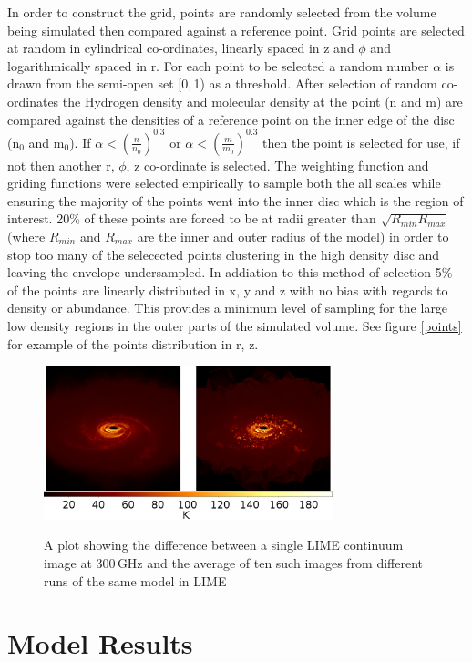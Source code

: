 \documentclass[useAMS,usenatbib]{mn2e}
\begin{document}
In order to construct the grid, points are randomly selected from the volume being simulated then compared against a reference point. Grid points are selected at random in cylindrical co-ordinates, linearly spaced in z and $\phi$ and logarithmically spaced in r. For each point to be selected a random number $\alpha$ is drawn from the semi-open set [0,$\,$1) as a threshold. After selection of random co-ordinates the Hydrogen density and molecular density at the point (n and m) are compared against the densities of a reference point on the inner edge of the disc (n$_0$ and m$_0$). If $\alpha<\left( \frac{n}{n_0} \right)^{0.3}$ or $\alpha< \left( \frac{m}{m_0} \right)^{0.3}$ then the point is selected for use, if not then another r, $\phi$, z co-ordinate is selected. The weighting function and griding functions were selected empirically to sample both the all scales while ensuring the majority of the points went into the inner disc which is the region of interest. 20\% of these points are forced to be at radii greater than $\sqrt{R_{min}R_{max}}$ (where $R_{min}$ and $R_{max}$ are the inner and outer radius of the model) in order to stop too many of the selecected points clustering in the high density disc and leaving the envelope undersampled. In addiation to this method of selection 5\% of the points are linearly distributed in x, y and z with no bias with regards to density or abundance. This provides a minimum level of sampling for the large low density regions in the outer parts of the simulated volume. See figure \ref{points} for example of the points distribution in r, z. \newline

\begin{figure}
 \includegraphics[width=84mm]{Figures/sim/average_comparison.png}
 \label{averages}
 \caption{A plot showing the difference between a single LIME continuum image at 300$\,$GHz and the average of ten such images from different runs of the same model in LIME}
\end{figure}


\section{Model Results}
\end{document}
